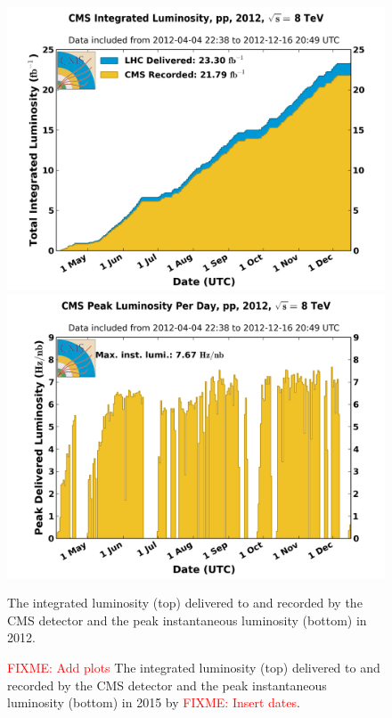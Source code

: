 \begin{figure}[!Hh]
       \centering
       \includegraphics[scale=0.5]{Figures/int_lumi_per_day_cumulative_pp_2012.png} \\
       \includegraphics[scale=0.5]{Figures/peak_lumi_per_day_pp_2012.png} 
       \caption[Integrated and peak luminosity per day recorded by CMS in 2012.]{The integrated luminosity (top) delivered to and recorded by the CMS detector and the peak instantaneous luminosity (bottom) in 2012.}
\label{figapp:CMSLumi2012}
\end{figure}


\begin{figure}[!Hh]
       \centering
       \caption[Integrated and peak luminosity per day recorded by CMS in 2015.]{\textcolor{red}{FIXME: Add plots} The integrated luminosity (top) delivered to and recorded by the CMS detector and the peak instantaneous luminosity (bottom) in 2015 by \textcolor{red}{FIXME: Insert dates}.}
\label{figapp:CMSLumi2015}
\end{figure}




